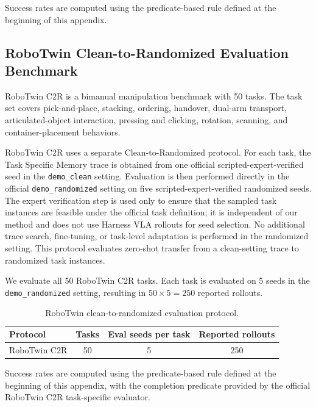 \documentclass[11pt]{article}
\begin{document}
Success rates are computed using the predicate-based rule defined at the beginning of this appendix.

\subsection{RoboTwin Clean-to-Randomized Evaluation Benchmark}
\label{app:benchmark:robotwin}

RoboTwin C2R is a bimanual manipulation benchmark with 50 tasks. The task set covers pick-and-place, stacking, ordering, handover, dual-arm transport, articulated-object interaction, pressing and clicking, rotation, scanning, and container-placement behaviors.

RoboTwin C2R uses a separate Clean-to-Randomized protocol. For each task, the Task Specific Memory trace is obtained from one official scripted-expert-verified seed in the \texttt{demo\_clean} setting. Evaluation is then performed directly in the official \texttt{demo\_randomized} setting on five scripted-expert-verified randomized seeds. The expert verification step is used only to ensure that the sampled task instances are feasible under the official task definition; it is independent of our method and does not use Harness VLA rollouts for seed selection. No additional trace search, fine-tuning, or task-level adaptation is performed in the randomized setting. This protocol evaluates zero-shot transfer from a clean-setting trace to randomized task instances.

We evaluate all 50 RoboTwin C2R tasks. Each task is evaluated on 5 seeds in the \texttt{demo\_randomized} setting, resulting in $50 \times 5 = 250$ reported rollouts.

\begin{table}[h]
    \centering
    \caption{RoboTwin clean-to-randomized evaluation protocol.}
    \label{tab:app_robotwin_protocol}
    \begin{tabular}{lccc}
        \toprule
        Protocol & Tasks & Eval seeds per task & Reported rollouts \\
        \midrule
        RoboTwin C2R & 50 & 5 & 250 \\
        \bottomrule
    \end{tabular}
\end{table}


Success rates are computed using the predicate-based rule defined at the beginning of this appendix, with the completion predicate provided by the official RoboTwin C2R task-specific evaluator.
\end{document}
